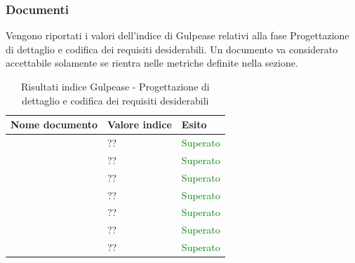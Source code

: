	 	\subsubsection{Documenti}	 	
	 	Vengono riportati i valori dell'indice di Gulpease relativi alla fase Progettazione di dettaglio e codifica dei requisiti desiderabili. Un documento va considerato accettabile solamente se rientra nelle metriche definite nella sezione.
		\begin{table}[!ht]
			\begin{center}
				\begin{tabularx}{0.9\textwidth}{|l|l|X|}
					\hline
					\textbf{Nome documento} & \textbf{Valore indice} & \textbf{Esito}\\
					\hline						
					\docNameVersionAdR & ?? & \textcolor{green}{Superato}\\
					\hline
					\docNameVersionGlo & ?? & \textcolor{green}{Superato}\\
					\hline					
					\docNameVersionNdP & ?? & \textcolor{green}{Superato}\\
					\hline					
					\docNameVersionPdP & ?? & \textcolor{green}{Superato}\\
					\hline					
					\docNameVersionPdQ & ?? & \textcolor{green}{Superato}\\
					\hline					
					\docNameVersionSdF & ?? & \textcolor{green}{Superato}\\
					\hline	
					\docNameVersionST & ?? & \textcolor{green}{Superato}\\
					\hline			
				\end{tabularx}
			\end{center}
			\caption{Risultati indice Gulpease - Progettazione di dettaglio e codifica dei requisiti desiderabili}
		\end{table}
	
\pagebreak